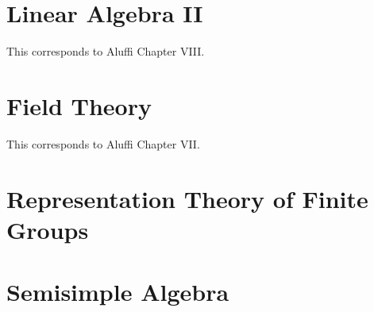 \documentclass[openany]{book}
\begin{document}
\chapter{Linear Algebra II}
This corresponds to Aluffi Chapter VIII.

\chapter{Field Theory}
This corresponds to Aluffi Chapter VII.

\chapter{Representation Theory of Finite Groups}

\chapter{Semisimple Algebra}


\newpage
\end{document}
